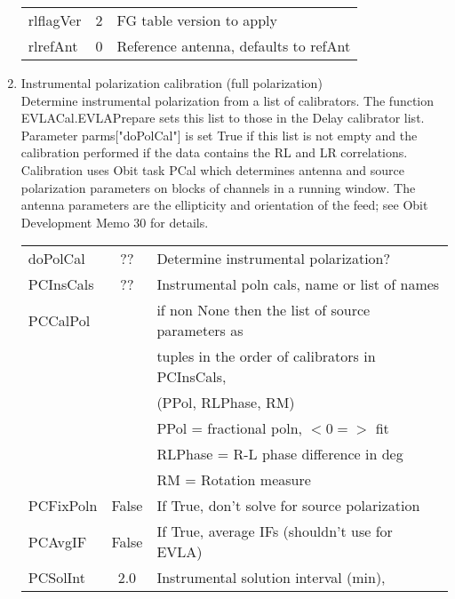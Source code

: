 \documentclass[11pt]{article}
\begin{document}
\begin{enumerate}
\begin{center}
\begin{tabular}{|l|c|l|}
rlflagVer   & 2            & FG table version to apply \\
rlrefAnt    & 0            & Reference antenna, defaults to refAnt\\
\hline
\end{tabular}
\end{center}
%
\newpage
\item Instrumental polarization calibration (full polarization)\\
Determine instrumental polarization from a list of calibrators.
The function EVLACal.EVLAPrepare sets this list to those in the Delay
calibrator list.
Parameter parms["doPolCal"] is set True if this list is not empty and
the calibration performed if the data contains the RL and LR
correlations. 
Calibration uses Obit task PCal which determines antenna and source
polarization parameters on blocks of channels in a running window.
The antenna parameters are the ellipticity and orientation of the
feed; see Obit Development Memo 30 for details.\\
\begin{center}
\begin{tabular}{|l|c|l|}
\hline
doPolCal  & ??     &  Determine instrumental polarization? \\
PCInsCals & ??     &  Instrumental poln cals, name or list of names\\
PCCalPol  &  &  if non None then the list of source parameters as \\
           & &  tuples in the order of calibrators in PCInsCals,\\
           & &  (PPol, RLPhase, RM)\\
           & &   PPol = fractional poln, $<0 =>$ fit\\
           & &   RLPhase = R-L phase difference in deg\\
           & &   RM      = Rotation measure \\
PCFixPoln & False  &  If True, don't solve for source polarization\\
PCAvgIF   & False  &  If True, average IFs (shouldn't use for EVLA)\\
PCSolInt  & 2.0    &  Instrumental solution interval (min), \\

\end{tabular}
\end{center}
\end{enumerate}
\end{document}
